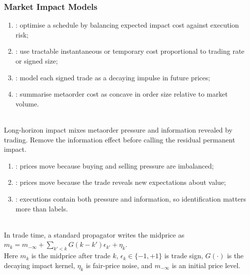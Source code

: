 \subsubsection{Market Impact Models}

\begin{taxonomy} 
\begin{enumerate}[label=\roman*.]
\setlength{\itemsep}{0pt}
\item {}: optimise a schedule by balancing expected impact cost against execution risk;
\item {}: use tractable instantaneous or temporary cost proportional to trading rate or signed size;
\item {}: model each signed trade as a decaying impulse in future prices;
\item {}: summarise metaorder cost as concave in order size relative to market volume.
\end{enumerate}
\end{taxonomy}

\begin{principle} \\
Long-horizon impact mixes metaorder pressure and information revealed by trading. Remove the information effect before calling the residual permanent impact.
\end{principle}

\begin{taxonomy} 
\begin{enumerate}[label=\roman*.]
\setlength{\itemsep}{0pt}
\item {}: prices move because buying and selling pressure are imbalanced;
\item {}: prices move because the trade reveals new expectations about value;
\item {}: executions contain both pressure and information, so identification matters more than labels.
\end{enumerate}
\end{taxonomy}

\begin{model} \\
In trade time, a standard propagator writes the midprice as $m_k=m_{-\infty}+\sum\limits_{k'<k}G(k-k')\epsilon_{k'}+\eta_k$.\\
Here $m_k$ is the midprice after trade $k$, $\epsilon_k\in\{-1,+1\}$ is trade sign, $G(\cdot)$ is the decaying impact kernel, $\eta_k$ is fair-price noise, and $m_{-\infty}$ is an initial price level.
\end{model}


